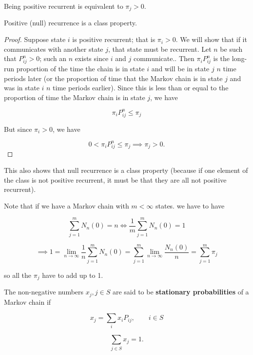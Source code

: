 \begin{remark}Being positive recurrent is equivalent to \(\pi_j >0\).

\end{remark}

\begin{proposition}Positive (null) recurrence is a class property.

\end{proposition}

\begin{proof}Suppose state \(i\) is positive recurrent; that is \(\pi_i > 0\). We will show that if it communicates with another state \(j\), that state must be recurrent. Let \(n\) be such that \(P_{ij}^n > 0\); such an \(n\) exists since \(i\) and \(j\) communicate.. Then \(\pi_i P_{ij}^n\) is the long-run proportion of the time the chain is in state \(i\) and will be in state \(j\) \(n\) time periods later (or the proportion of time that the Markov chain is in state \(j\) and was in state \(i\) \(n\) time periods earlier). Since this is less than or equal to the proportion of time the Markov chain is in state \(j\), we have

\[
\pi_i P_{ij}^n \leq \pi_j
\]

But since \(\pi_i > 0\), we have

\[
0 < \pi_i P_{ij}^n \leq \pi_j \implies \pi_j > 0.
\]

\end{proof}

\begin{remark}This also shows that null recurrence is a class property (because if one element of the class is not positive recurrent, it must be that they are all not positive recurrent).

\end{remark}



Note that if we have a Markov chain with \(m < \infty\) states. we have to have

\[
\sum_{j=1}^m N_n(0) = n \iff  \frac{1}{m} \sum_{j=1}^m N_n(0) =1
\]

\[
\implies 1 = \lim_{n \to \infty} \frac{1}{n} \sum_{j=1}^m N_n(0) =  \sum_{j=1}^m \lim_{n \to \infty} \frac{N_n(0)}{n}    =  \sum_{j=1}^m \pi_j
\]

so all the \(\pi_j\) have to add up to 1. 

\begin{definition}\label{stoch.stat.probs}The non-negative numbers \(x_j, j \in S\) are said to be \textbf{stationary probabilities} of a Markov chain if 

\[
x_j = \sum_i x_i P_{ij}, \qquad i \in S
\]

\[
\sum_{j \in S} x_j = 1.
\]

\end{definition}

